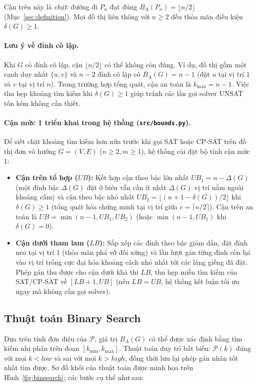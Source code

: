 \documentclass[a4paper,fleqn]{cas-sc}
\begin{document}
Cận trên này là \emph{chặt}: đường đi $P_n$ đạt đúng $B_A(P_n) = \lfloor n/2 \rfloor$ (Mục~\ref{sec:definition}). Mọi đồ thị liên thông với $n \ge 2$ đều thỏa mãn điều kiện $\delta(G) \ge 1$.

\paragraph{Lưu ý về đỉnh cô lập.} Khi $G$ có đỉnh cô lập, cận $\lfloor n/2 \rfloor$ có thể không còn đúng. Ví dụ, đồ thị gồm một cạnh duy nhất $\{u, v\}$ và $n - 2$ đỉnh cô lập có $B_A(G) = n - 1$ (đặt $u$ tại vị trí $1$ và $v$ tại vị trí $n$). Trong trường hợp tổng quát, cận an toàn là $k_{\max} = n - 1$. Việc thu hẹp khoảng tìm kiếm khi $\delta(G) \ge 1$ giúp tránh các lần gọi solver UNSAT tốn kém không cần thiết.

\paragraph{Cận mức 1 triển khai trong hệ thống (\texttt{src/bounds.py}).} Để siết chặt khoảng tìm kiếm hơn nữa trước khi gọi SAT hoặc CP-SAT trên đồ thị đơn vô hướng $G = (V, E)$ ($n \ge 2, m \ge 1$), hệ thống cài đặt bộ tính cận mức 1:
\begin{itemize}
    \item \textbf{Cận trên tổ hợp ($UB$):} Kết hợp cận theo bậc lớn nhất $UB_1 = n - \Delta(G)$ (một đỉnh bậc $\Delta(G)$ đặt ở biên vẫn cần ít nhất $\Delta(G)$ vị trí nằm ngoài khoảng cấm) và cận theo bậc nhỏ nhất $UB_2 = \lfloor (n + 1 - \delta(G)) / 2 \rfloor$ khi $\delta(G) \ge 1$ (tổng quát hóa chứng minh tại vị trí giữa $c = \lceil n/2 \rceil$). Cận trên an toàn là $UB = \min(n - 1, UB_1, UB_2)$ (hoặc $\min(n - 1, UB_1)$ khi $\delta(G) = 0$).
    \item \textbf{Cận dưới tham lam ($LB$):} Sắp xếp các đỉnh theo bậc giảm dần, đặt đỉnh neo tại vị trí $1$ (thỏa mãn phá vỡ đối xứng) và lần lượt gán từng đỉnh còn lại vào vị trí trống cực đại hóa khoảng cách nhỏ nhất tới các láng giềng đã đặt. Phép gán thu được cho cận dưới khả thi $LB$, thu hẹp miền tìm kiếm của SAT/CP-SAT về $[LB + 1, UB]$ (nếu $LB = UB$, hệ thống kết luận tối ưu ngay mà không cần gọi solver).
\end{itemize}

\subsection{Thuật toán Binary Search}
\label{sec:binsearch}
Dựa trên tính đơn điệu của $\mathcal{P}$, giá trị $B_A(G)$ có thể được xác định bằng tìm kiếm nhị phân trên đoạn $[k_{\min}, k_{\max}]$. Thuật toán duy trì bất biến: $\mathcal{P}(k)$ đúng với mọi $k < low$ và sai với mọi $k > high$; đồng thời lưu lại phép gán nhãn tốt nhất tìm được. Sơ đồ khối của thuật toán được minh họa trên Hình~\ref{fig:binsearch}; các bước cụ thể như sau:
\end{document}
